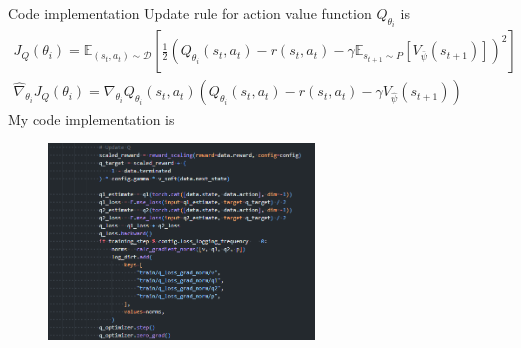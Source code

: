 \documentclass[8pt]{beamer}
\newcommand{\mbb}[1]{\mathbb{#1}}
\begin{document}
\begin{frame}{Code implementation}
    Update rule for action value function $Q_{\theta_i}$ is
    \[
    \begin{gathered}
        J_Q(\theta_i) = \mbb{E}_{(s_t,a_t) \sim \mathcal{D}} \left[ \frac{1}{2} \left( Q_{\theta_i} (s_t, a_t) - r(s_t, a_t) - \gamma \mbb{E}_{s_{t+1}\sim P} [V_{\bar{\psi}} (s_{t+1})] \right)^2\right] \\
        \hat{\nabla}_{\theta_i} J_Q (\theta_i) = \nabla_{\theta_i} Q_{\theta_i} (s_t, a_t) \left(Q_{\theta_i}(s_t, a_t) - r(s_t, a_t) - \gamma V_{\hat{\psi}}(s_{t+1}) \right)
    \end{gathered}
    \]
    My code implementation is
    \begin{figure}
        \centering
        \includegraphics[width=0.63\textwidth]{UpdateQ.png}
    \end{figure}
\end{frame}
\end{document}
